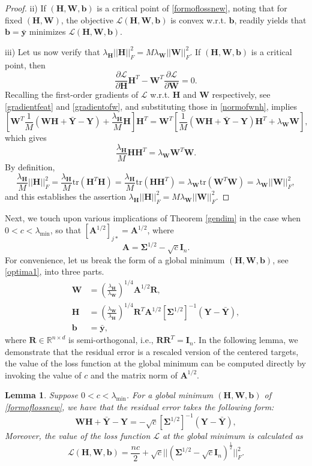 \documentclass{article}
\theoremstyle{plain}
\newtheorem{lemma}[theorem]{Lemma}
\theoremstyle{definition}
\theoremstyle{remark}
\newcommand{\bW}{{\mathbf W}}
\newcommand{\bY}{{\mathbf Y}}
\newcommand{\bR}{{\mathbf R}}
\newcommand{\bA}{{\mathbf A}}
\newcommand{\bH}{{\mathbf H}}
\newcommand{\bI}{{\mathbf I}}
\newcommand{\byb}{{\bar{\mathbf y}}}
\newcommand{\bYb}{{\bar{\mathbf Y}}}
\newcommand{\bb}{{\mathbf b}}
\newcommand{\bSigma}{{\mathbf \Sigma}}
\newcommand{\lH}{\lambda_{\bH}}
\newcommand{\lW}{\lambda_{\bW}}
\begin{document}
\begin{proof}
ii) If $(\bH, \bW, \bb)$ is a critical point of \eqref{formoflossnew}, noting that for fixed $(\bH, \bW)$, the objective 
$\mathcal{L}(\bH, \bW, \bb)$ is convex w.r.t. $\bb$, readily yields that $\bb=\byb$ minimizes $\mathcal{L}(\bH, \bW, \bb)$.

iii) Let us now verify that $\lH ||\bH||_F^2=M\lW ||\bW||_F^2$.
If $(\bH, \bW, \bb)$ is a critical point, then
\begin{equation} \label{normofwnh}
\frac{\partial \mathcal{L}}{\partial \bH} \bH^{T}-\bW^{T} \frac{\partial \mathcal{L}}{\partial \bW}=0.
\end{equation}
Recalling the first-order gradients of $\mathcal{L}$ w.r.t. $\bH$ and $\bW$ respectively, see \eqref{gradientfeat} and \eqref{gradientofw}, and substituting those in \eqref{normofwnh}, implies
\[
\left[\bW^{T} \frac{1}{M} (\bW \bH+\bYb-\bY)+\frac{\lH}{M} \bH \right] \bH^{T} = \bW^{T} \left[\frac{1}{M} (\bW \bH+\bYb-\bY) \bH^{T}+\lW \bW\right],
\]
which gives
\[
\frac{\lH}{M} \bH\bH^{T}=\lW \bW^{T}\bW.
\]
By definition,
\[
\frac{\lH}{M}||\bH||_F^2=\frac{\lH}{M} \text{tr}( \bH^{T} \bH)=\frac{\lH}{M} \text{tr}(\bH \bH^{T})=\lW \text{tr}(\bW^{T} \bW)=\lW ||\bW||_F^2,
\]
and this establishes the assertion $\lH ||\bH||_F^2 = M \lW ||\bW||_F^2$.

\end{proof}

Next, we touch upon various implications of Theorem \ref{gendim} in the case when $0<c<\lambda_{\text{min}}$, so that $[\bA^{1/2}]_{j*}=\bA^{1/2}$,   
where 
\begin{equation} \label{redefofa}
\bA=\bSigma^{1/2}-\sqrt{c} \bI_n.
\end{equation}  
For convenience, let us break the form of a global minimum $(\bH, \bW, \bb)$, see \eqref{optima1}, into three parts.
\begin{align}
\bW  &=   \left(\frac{\lH}{\lW}\right)^{1/4} \bA^{1/2}\bR \label{optW},
\\
\bH  &=  \left(\frac{\lW}{\lH}\right)^{1/4} \bR^{T}  \bA^{1/2} [\bSigma^{1/2}]^{-1} (\bY - \bYb), \label{optH}
\\
\bb &=  \byb, \label{optb}
\end{align}
where $\bR\in \mathbb{R}^{n\times d}$ is semi-orthogonal, i.e., $\bR \bR^T=\bI_n$. In the following lemma, we demonstrate that the residual error is a rescaled version of the centered targets, the value of the loss function at the global minimum can be computed directly by invoking the value of $c$ and the matrix norm of $\bA^{1/2}$.
\begin{lemma} \label{suppmat2}
Suppose $0<c<\lambda_{\min}$. For a global minimum $(\bH, \bW, \bb)$ of \eqref{formoflossnew}, we have that the residual error takes the following form:
\[
\bW \bH + \bYb-\bY=-\sqrt{c} [\bSigma^{1/2}]^{-1} (\bY-\bYb),
\]
Moreover, the value of the loss function $\mathcal{L}$ at the global minimum is calculated as
\[
\mathcal{L}(\bH, \bW, \bb)=\frac{n c}{2}+\sqrt{c} ||(\bSigma^{1/2}-\sqrt{c} \bI_n)^{\frac{1}{2}}||_F^2.
\]
\end{lemma}
\end{document}

